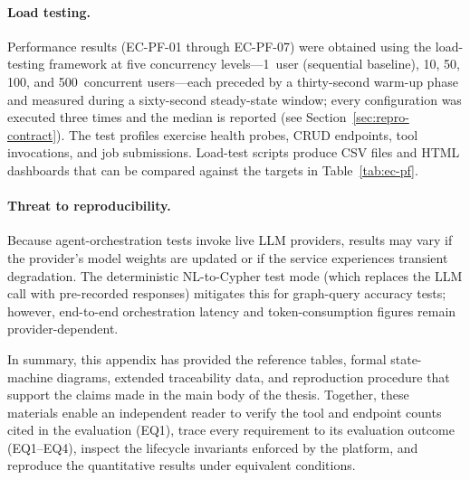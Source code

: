 \documentclass[a4paper]{sapthesis}
\begin{document}
\paragraph{Load testing.}
Performance results (EC-PF-01 through EC-PF-07) were obtained using the
load-testing framework at five concurrency levels---1~user (sequential
baseline), 10, 50, 100, and 500~concurrent users---each preceded by a
thirty-second warm-up phase and measured during a sixty-second
steady-state window; every configuration was executed three times and
the median is reported (see Section~\ref{sec:repro-contract}).  The test
profiles exercise health probes, CRUD endpoints, tool invocations, and
job submissions.  Load-test scripts produce CSV files and HTML dashboards
that can be compared against the targets in Table~\ref{tab:ec-pf}.

\paragraph{Threat to reproducibility.}
Because agent-orchestration tests invoke live LLM providers, results may
vary if the provider's model weights are updated or if the service
experiences transient degradation.  The deterministic NL-to-Cypher test
mode (which replaces the LLM call with pre-recorded responses) mitigates
this for graph-query accuracy tests; however, end-to-end orchestration
latency and token-consumption figures remain provider-dependent.

\bigskip
\noindent
In summary, this appendix has provided the reference tables, formal
state-machine diagrams, extended traceability data, and reproduction
procedure that support the claims made in the main body of the thesis.
Together, these materials enable an independent reader to verify the
tool and endpoint counts cited in the evaluation (EQ1), trace every
requirement to its evaluation outcome (EQ1--EQ4), inspect the lifecycle
invariants enforced by the platform, and reproduce the quantitative
results under equivalent conditions.


\backmatter



\end{document}

